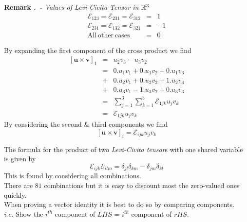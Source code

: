\documentclass[11pt,a4paper]{article}
\begin{document}
 \textbf{Remark .\ - }\textit{Values of Levi-Civita Tensor in $\mathbb{R}^3$}
\[\begin{array}{rcr}
\mathcal{E}_{123}=\mathcal{E}_{231}=\mathcal{E}_{312}&=&1\\
\mathcal{E}_{231}=\mathcal{E}_{132}=\mathcal{E}_{321}&=&-1\\
\mathrm{All\ other\ cases}&=&0
\end{array}\]

By expanding the first component of the cross product we find
\[\begin{array}{rcl}[\textbf{u}\times\textbf{v}]_1&=&u_2v_3-u_3v_2\\
&=&0.u_1v_1+0.u_1v_2+0.u_1v_3\\
&+&0.u_2v_1+0.u_2v_2+1.u_2v_3\\
&+&0.u_3v_1-1.u_3v_2+0.u_3v_3\\
&=&\sum_{j=1}^3\sum_{k=1}^3 \mathcal{E}_{1jk}u_jv_k\\
&=&\mathcal{E}_{1jk}u_jv_k
\end{array}\]
By considering the second \& third components we find
$$[\textbf{u}\times\textbf{v}]_i=\mathcal{E}_{ijk}u_jv_k$$

The formula for the product of two \textit{Levi-Civita tensor}s with one shared variable is given by
$$\mathcal{E}_{ijk}\mathcal{E}_{ilm}=\delta_{jl}\delta_{km}-\delta_{jm}\delta_{kl}$$
This is found by considering all combinations.\\
There are $81$ combinations but it is easy to discount most the zero-valued ones quickly.\\

When proving a vector identity it is best to do so by comparing components.\\
\textit{i.e.} Show the $i^{th}$ component of $LHS$ = $i^{th}$ component of $rHS$.\\
\end{document}
